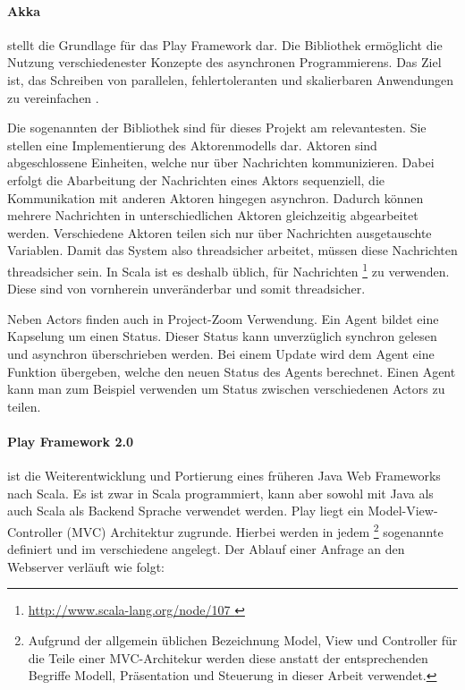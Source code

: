 \paragraph{Akka}\label{sec:actor} stellt die Grundlage für das Play Framework dar. Die Bibliothek ermöglicht die Nutzung verschiedenester Konzepte des asynchronen Programmierens. Das Ziel ist, das Schreiben von parallelen, fehlertoleranten und skalierbaren Anwendungen zu vereinfachen \cite{what-is-akka}. 

Die sogenannten  der Bibliothek sind für dieses Projekt am relevantesten. Sie stellen eine Implementierung des Aktorenmodells dar. Aktoren sind abgeschlossene Einheiten, welche nur über Nachrichten kommunizieren. Dabei erfolgt die Abarbeitung der Nachrichten eines Aktors sequenziell, die Kommunikation mit anderen Aktoren hingegen asynchron. Dadurch können mehrere Nachrichten in unterschiedlichen Aktoren gleichzeitig abgearbeitet werden. Verschiedene Aktoren teilen sich nur über Nachrichten ausgetauschte Variablen. Damit das System also threadsicher arbeitet, müssen diese Nachrichten threadsicher sein. In Scala ist es deshalb üblich, für Nachrichten \footnote{\url{ http://www.scala-lang.org/node/107 }} zu verwenden. Diese sind von vornherein unveränderbar und somit threadsicher.

Neben Actors finden auch  in Project-Zoom Verwendung. Ein Agent bildet eine Kapselung um einen Status. Dieser Status kann unverzüglich synchron gelesen und asynchron überschrieben werden. Bei einem Update wird dem Agent eine Funktion übergeben, welche den neuen Status des Agents berechnet. Einen Agent kann man zum Beispiel verwenden um Status zwischen verschiedenen Actors zu teilen.

\paragraph{Play Framework 2.0} ist die Weiterentwicklung  und Portierung eines früheren Java Web Frameworks nach Scala. Es ist zwar in Scala programmiert, kann aber sowohl mit Java als auch Scala als Backend Sprache verwendet werden. Play liegt ein Model-View-Controller (MVC) Architektur zugrunde. Hierbei werden in jedem \footnote{Aufgrund der allgemein üblichen Bezeichnung Model, View und Controller für die Teile einer MVC-Architekur werden diese anstatt der entsprechenden Begriffe Modell, Präsentation und Steuerung in dieser Arbeit verwendet.} sogenannte  definiert und im  verschiedene  angelegt. Der Ablauf einer Anfrage an den Webserver verläuft wie folgt:

